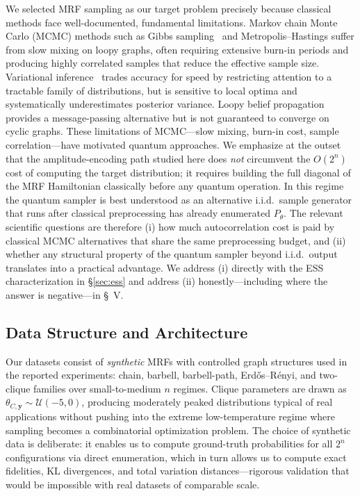 \documentclass[conference,10pt]{IEEEtran}
\begin{document}
We selected MRF sampling as our target problem precisely because classical methods face well-documented, fundamental limitations. Markov chain Monte Carlo (MCMC) methods such as Gibbs sampling~\cite{geman1984stochastic} and Metropolis--Hastings suffer from slow mixing on loopy graphs, often requiring extensive burn-in periods and producing highly correlated samples that reduce the effective sample size. Variational inference~\cite{wainwright2008graphical} trades accuracy for speed by restricting attention to a tractable family of distributions, but is sensitive to local optima and systematically underestimates posterior variance. Loopy belief propagation~\cite{pearl1988probabilistic} provides a message-passing alternative but is not guaranteed to converge on cyclic graphs. These limitations of MCMC---slow mixing, burn-in cost, sample correlation---have motivated quantum approaches. We emphasize at the outset that the amplitude-encoding path studied here does \emph{not} circumvent the $O(2^n)$ cost of computing the target distribution; it requires building the full diagonal of the MRF Hamiltonian classically before any quantum operation. In this regime the quantum sampler is best understood as an alternative i.i.d.\ sample generator that runs after classical preprocessing has already enumerated $P_\theta$. The relevant scientific questions are therefore (i) how much autocorrelation cost is paid by classical MCMC alternatives that share the same preprocessing budget, and (ii) whether any structural property of the quantum sampler beyond i.i.d.\ output translates into a practical advantage. We address (i) directly with the ESS characterization in \S\ref{sec:ess} and address (ii) honestly---including where the answer is negative---in \S~V.

\subsection{Data Structure and Architecture}

Our datasets consist of \emph{synthetic} MRFs with controlled graph structures used in the reported experiments: chain, barbell, barbell-path, Erd\H{o}s--R\'enyi, and two-clique families over small-to-medium $n$ regimes. Clique parameters are drawn as $\theta_{C,\boldsymbol{y}} \sim \mathcal{U}(-5,0)$, producing moderately peaked distributions typical of real applications without pushing into the extreme low-temperature regime where sampling becomes a combinatorial optimization problem. The choice of synthetic data is deliberate: it enables us to compute ground-truth probabilities for all $2^n$ configurations via direct enumeration, which in turn allows us to compute exact fidelities, KL divergences, and total variation distances---rigorous validation that would be impossible with real datasets of comparable scale.
\end{document}
